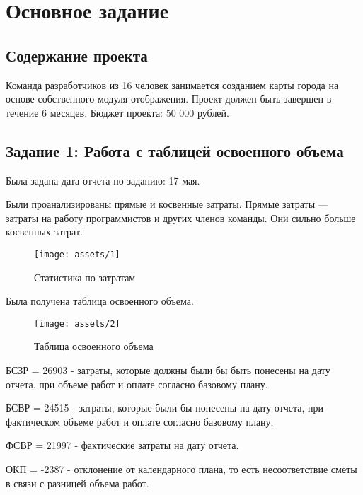 \chapter{Основное задание}

\section{Содержание проекта}

Команда разработчиков из 16 человек занимается созданием карты города на основе собственного модуля отображения. Проект должен быть завершен в течение 6 месяцев. Бюджет проекта: 50 000 рублей.

\section{Задание 1: Работа с таблицей освоенного объема}

Была задана дата отчета по заданию: 17 мая.

Были проанализированы прямые и косвенные затраты. Прямые затраты --- затраты на работу программистов и других членов команды. Они сильно больше косвенных затрат.

\begin{figure}[H]
    \begin{center}
    \texttt{[image: assets/1]}
    \caption{Статистика по затратам}
    \label{fig:1}
    \end{center}
\end{figure}

Была получена таблица освоенного объема.


\begin{figure}[H]
    \begin{center}
    \texttt{[image: assets/2]}
    \caption{Таблица освоенного объема}
    \label{fig:2}
    \end{center}
\end{figure}

БСЗР = 26903 - затраты, которые должны были бы быть понесены на дату отчета, при объеме работ и оплате согласно базовому плану.

БСВР = 24515 - затраты, которые были бы понесены на дату отчета, при фактическом объеме работ и оплате согласно базовому плану.

ФСВР = 21997 - фактические затраты на дату отчета.

ОКП = -2387 - отклонение от календарного плана, то есть несоответствие сметы в связи с разницей объема работ.

